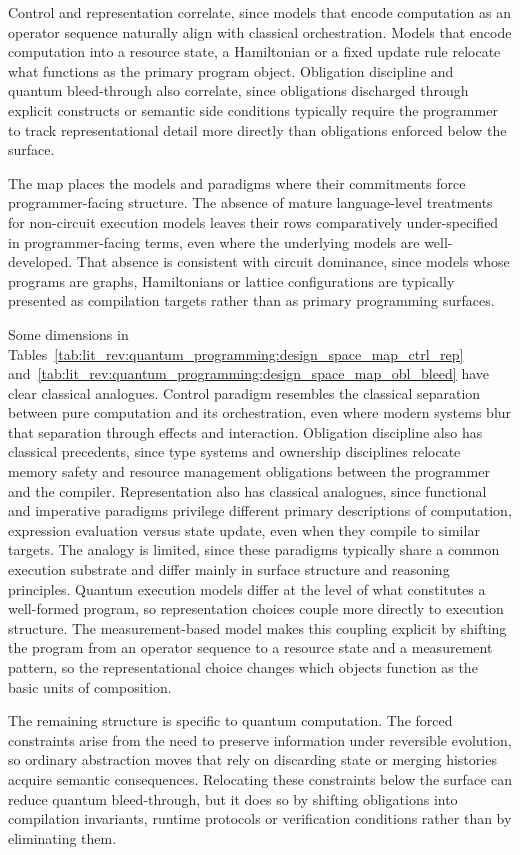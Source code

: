 Control and representation correlate, since models that encode computation as an operator sequence naturally align with classical orchestration.
Models that encode computation into a resource state, a Hamiltonian or a fixed update rule relocate what functions as the primary program object.
Obligation discipline and quantum bleed-through also correlate, since obligations discharged through explicit constructs or semantic side conditions typically require the programmer to track representational detail more directly than obligations enforced below the surface.

The map places the models and paradigms where their commitments force programmer-facing structure.
The absence of mature language-level treatments for non-circuit execution models leaves their rows comparatively under-specified in programmer-facing terms, even where the underlying models are well-developed.
That absence is consistent with circuit dominance, since models whose programs are graphs, Hamiltonians or lattice configurations are typically presented as compilation targets rather than as primary programming surfaces.

Some dimensions in Tables~\ref{tab:lit_rev:quantum_programming:design_space_map_ctrl_rep} and~\ref{tab:lit_rev:quantum_programming:design_space_map_obl_bleed} have clear classical analogues.
Control paradigm resembles the classical separation between pure computation and its orchestration, even where modern systems blur that separation through effects and interaction.
Obligation discipline also has classical precedents, since type systems and ownership disciplines relocate memory safety and resource management obligations between the programmer and the compiler.
Representation also has classical analogues, since functional and imperative paradigms privilege different primary descriptions of computation, expression evaluation versus state update, even when they compile to similar targets.
The analogy is limited, since these paradigms typically share a common execution substrate and differ mainly in surface structure and reasoning principles.
Quantum execution models differ at the level of what constitutes a well-formed program, so representation choices couple more directly to execution structure.
The measurement-based model makes this coupling explicit by shifting the program from an operator sequence to a resource state and a measurement pattern, so the representational choice changes which objects function as the basic units of composition.

The remaining structure is specific to quantum computation.
The forced constraints arise from the need to preserve information under reversible evolution, so ordinary abstraction moves that rely on discarding state or merging histories acquire semantic consequences.
Relocating these constraints below the surface can reduce quantum bleed-through, but it does so by shifting obligations into compilation invariants, runtime protocols or verification conditions rather than by eliminating them.

